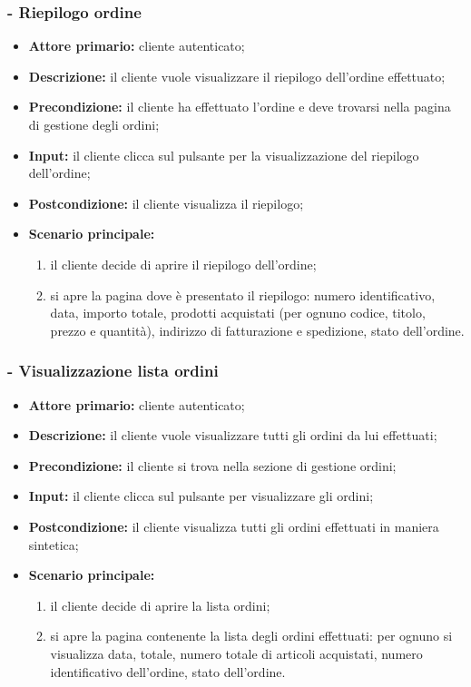 \subsubsection{ - Riepilogo ordine}
\begin{itemize}
    \item \textbf{Attore primario:} cliente autenticato;
    \item \textbf{Descrizione:} il cliente vuole visualizzare il riepilogo dell'ordine effettuato;
    \item \textbf{Precondizione:} il cliente ha effettuato l'ordine e deve trovarsi nella pagina di gestione degli ordini;
    \item \textbf{Input:} il cliente clicca sul pulsante per la visualizzazione del riepilogo dell'ordine;
    \item \textbf{Postcondizione:} il cliente visualizza il riepilogo;
    \item \textbf{Scenario principale:}
          \begin{enumerate}
              \item il cliente decide di aprire il riepilogo dell'ordine;
              \item si apre la pagina dove è presentato il riepilogo: numero identificativo, data, importo totale, prodotti acquistati (per ognuno codice, titolo, prezzo e quantità), indirizzo di fatturazione e spedizione, stato dell'ordine.
          \end{enumerate}
\end{itemize}

\stepsubUserCase
\subsubsection{ - Visualizzazione lista ordini}
\begin{itemize}
    \item \textbf{Attore primario:} cliente autenticato;
    \item \textbf{Descrizione:} il cliente vuole visualizzare tutti gli ordini da lui effettuati;
    \item \textbf{Precondizione:} il cliente si trova nella sezione di gestione ordini;
    \item \textbf{Input:} il cliente clicca sul pulsante per visualizzare gli ordini;
    \item \textbf{Postcondizione:} il cliente visualizza tutti gli ordini effettuati in maniera sintetica;
    \item \textbf{Scenario principale:}
          \begin{enumerate}
              \item il cliente decide di aprire la lista ordini;
              \item si apre la pagina contenente la lista degli ordini effettuati: per ognuno si visualizza data, totale, numero totale di articoli acquistati, numero identificativo dell'ordine, stato dell'ordine.
          \end{enumerate}
\end{itemize}


